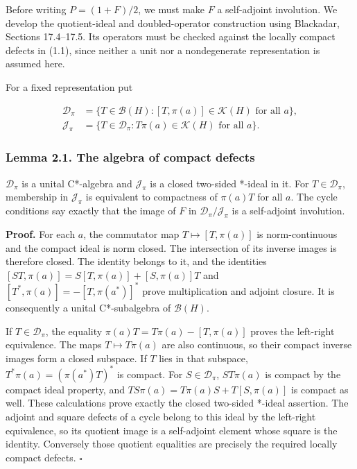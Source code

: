 \documentclass[
  11pt,
]{article}
\begin{document}
Before writing \(P=(1+F)/2\), we must make \(F\) a self-adjoint
involution. We develop the quotient-ideal and doubled-operator
construction using Blackadar, Sections 17.4--17.5. Its operators must be
checked against the locally compact defects in (1.1), since neither a
unit nor a nondegenerate representation is assumed here.

For a fixed representation put

\[
\begin{aligned}
\mathcal D_\pi&=\{T\in\mathcal B(H):[T,\pi(a)]\in\mathcal K(H)
                                  \text{ for all }a\},\\
\mathcal J_\pi&=\{T\in\mathcal D_\pi:T\pi(a)\in\mathcal K(H)
                                  \text{ for all }a\}.
\end{aligned}
\tag{2.1}
\]

\subsubsection{Lemma 2.1. The algebra of compact
defects}\label{lemma-2.1.-the-algebra-of-compact-defects}

\(\mathcal D_\pi\) is a unital C*-algebra and \(\mathcal J_\pi\) is a
closed two-sided *-ideal in it. For \(T\in\mathcal D_\pi\), membership
in \(\mathcal J_\pi\) is equivalent to compactness of \(\pi(a)T\) for
all \(a\). The cycle conditions say exactly that the image of \(F\) in
\(\mathcal D_\pi/\mathcal J_\pi\) is a self-adjoint involution.

\textbf{Proof.} For each \(a\), the commutator map
\(T\mapsto[T,\pi(a)]\) is norm-continuous and the compact ideal is norm
closed. The intersection of its inverse images is therefore closed. The
identity belongs to it, and the identities
\([ST,\pi(a)]=S[T,\pi(a)]+[S,\pi(a)]T\) and
\([T^*,\pi(a)]=-[T,\pi(a^*)]^*\) prove multiplication and adjoint
closure. It is consequently a unital C*-subalgebra of \(\mathcal B(H)\).

If \(T\in\mathcal D_\pi\), the equality \(\pi(a)T=T\pi(a)-[T,\pi(a)]\)
proves the left-right equivalence. The maps \(T\mapsto T\pi(a)\) are
also continuous, so their compact inverse images form a closed subspace.
If \(T\) lies in that subspace, \(T^*\pi(a)=(\pi(a^*)T)^*\) is compact.
For \(S\in\mathcal D_\pi\), \(ST\pi(a)\) is compact by the compact ideal
property, and \(TS\pi(a)=T\pi(a)S+T[S,\pi(a)]\) is compact as well.
These calculations prove exactly the closed two-sided *-ideal assertion.
The adjoint and square defects of a cycle belong to this ideal by the
left-right equivalence, so its quotient image is a self-adjoint element
whose square is the identity. Conversely those quotient equalities are
precisely the required locally compact defects. \(\square\)
\end{document}
